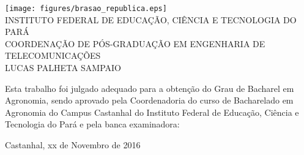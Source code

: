 \begin{folhadeaprovacao}
\setlength{\ABNTsignthickness}{0.2pt}
\setlength{\ABNTsignskip}{1.7cm}

\begin{center}
\texttt{[image: figures/brasao\_republica.eps]}\\

            {INSTITUTO FEDERAL DE EDUCAÇÃO, CIÊNCIA E TECNOLOGIA DO PARÁ} \\
            {COORDENAÇÃO DE PÓS-GRADUAÇÃO EM ENGENHARIA DE TELECOMUNICAÇÕES}  \\

    \vspace{1.5cm}
                                    {LUCAS PALHETA SAMPAIO}\\
    \bfseries{}
\end{center}

Esta trabalho foi julgado adequado para a obten\c{c}\~{a}o do Grau de Bacharel em Agronomia, sendo aprovado pela Coordenadoria do curso de Bacharelado em Agronomia do Campus Castanhal do Instituto Federal de Educação, Ciência e Tecnologia do Pará e pela banca examinadora:

    \vspace{0.15cm}
    \vspace{0.15cm}%

    \begin{center}
        Castanhal, xx de Novembro de 2016
    \end{center}
\end{folhadeaprovacao}